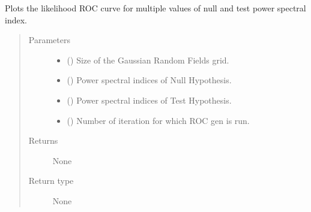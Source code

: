 \documentclass[letterpaper,10pt,english]{sphinxmanual}
\begin{document}

\begin{fulllineitems}
\label{\detokenize{testsFunc:testsFunc.testLikelihoodROC}}
\sphinxAtStartPar
Plots the likelihood ROC curve for multiple values of null and test power spectral index.
\begin{quote}\begin{description}
\item[{Parameters}] \leavevmode\begin{itemize}
\item {} 
\sphinxAtStartPar
{} () \textendash{} Size of the Gaussian Random Fields grid.

\item {} 
\sphinxAtStartPar
{} () \textendash{} Power spectral indices of Null Hypothesis.

\item {} 
\sphinxAtStartPar
{} () \textendash{} Power spectral indices of Test Hypothesis.

\item {} 
\sphinxAtStartPar
{} () \textendash{} Number of iteration for which ROC gen is run.

\end{itemize}

\item[{Returns}] \leavevmode
\sphinxAtStartPar
None

\item[{Return type}] \leavevmode
\sphinxAtStartPar
None

\end{description}\end{quote}

\end{fulllineitems}
\end{document}

